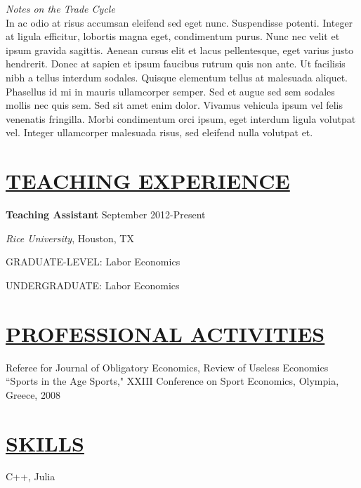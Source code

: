 \documentclass{res} %
\begin{document}
\begin{resume}
\vspace{6pt} %

\noindent \emph{Notes on the Trade Cycle}      \hfill   \\
In ac odio at risus accumsan eleifend sed eget nunc. Suspendisse potenti. Integer at ligula efficitur, lobortis magna eget, condimentum purus. Nunc nec velit et ipsum gravida sagittis. Aenean cursus elit et lacus pellentesque, eget varius justo hendrerit. Donec at sapien et ipsum faucibus rutrum quis non ante. Ut facilisis nibh a tellus interdum sodales. Quisque elementum tellus at malesuada aliquet. Phasellus id mi in mauris ullamcorper semper. Sed et augue sed sem sodales mollis nec quis sem. Sed sit amet enim dolor. Vivamus vehicula ipsum vel felis venenatis fringilla. Morbi condimentum orci ipsum, eget interdum ligula volutpat vel. Integer ullamcorper malesuada risus, sed eleifend nulla volutpat et.
\vspace{10pt} %

\vspace{-.2cm}
\section{\scshape \underline{TEACHING EXPERIENCE}} 
\vspace{8pt}

\noindent \textbf{Teaching Assistant} \hfill     September 2012-Present \par
{\sl Rice University}, Houston, TX \par
GRADUATE-LEVEL: Labor Economics\par
UNDERGRADUATE: Labor Economics\par 

\vspace{-.2cm}
\section{\scshape \underline{PROFESSIONAL ACTIVITIES}}
\vspace{6pt}
\noindent Referee for Journal of Obligatory Economics, Review of Useless Economics \\
\noindent ``Sports in the Age Sports," XXIII Conference on Sport Economics, Olympia, Greece, 2008 \

\vspace{0.15in} 
\section{\scshape \underline{SKILLS}}
\vspace{6pt} 
C++, Julia

\end{resume}
\end{document}
